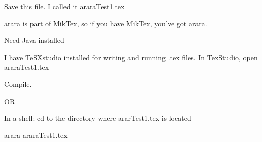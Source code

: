 \documentclass{article}
\begin{document}
		
	Save this file. I called it araraTest1.tex
	
	arara is part of MikTex, so if you have MikTex, you've got arara.
	
	Need Java installed
	
	I have TeSXstudio installed for writing and running .tex files.
	In TexStudio, open araraTest1.tex
	
	Compile.
	
	OR
	
	In a shell:
	cd to the directory where ararTest1.tex is located
	
	arara araraTest1.tex
	
	
\end{document}

